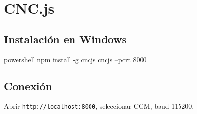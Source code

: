 \chapter{CNC.js}
\label{ch:cncjs}
\section*{Instalación en Windows}
\begin{codeblock}{powershell}
npm install -g cncjs
cncjs --port 8000
\end{codeblock}

\section*{Conexión}
Abrir \texttt{http://localhost:8000}, seleccionar COM, baud 115200.

